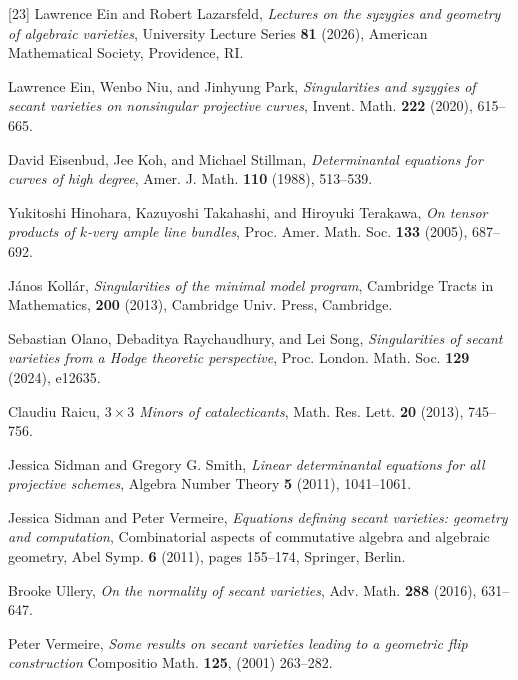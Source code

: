 \documentclass{amsart}
\theoremstyle{plain}
\theoremstyle{definition}
\theoremstyle{remark}
\begin{document}
\begin{thebibliography}{[23]}
Lawrence Ein and Robert Lazarsfeld, \emph{Lectures on the syzygies and geometry of algebraic varieties}, University Lecture Series \textbf{81} (2026), 
American Mathematical Society, Providence, RI.

Lawrence Ein, Wenbo Niu, and Jinhyung Park, \emph{Singularities and syzygies of secant varieties on nonsingular projective curves}, Invent. \!Math. \textbf{222} (2020), 615--665.

David Eisenbud, Jee Koh, and Michael Stillman, \textit{Determinantal equations for curves of high degree}, Amer. J. Math. \textbf{110} (1988), 513--539.

 Yukitoshi Hinohara, Kazuyoshi Takahashi, and Hiroyuki Terakawa, \textit{On tensor products of $k$-very ample line bundles}, Proc. Amer. Math. Soc. \textbf{133} (2005), 687--692.

 J\'{a}nos Koll\'{a}r, \emph{Singularities of the minimal model program}, Cambridge Tracts in Mathematics, \textbf{200} (2013), Cambridge Univ. \!Press, Cambridge.

Sebastian Olano, Debaditya Raychaudhury, and Lei Song, \textit{Singularities of secant varieties from a Hodge theoretic perspective}, Proc. London. Math. Soc. \textbf{129} (2024), e12635.

Claudiu Raicu,
\newblock \textit{$3\times 3$ Minors of catalecticants},
\newblock Math. Res. Lett. \textbf{20} (2013), 745--756.

Jessica Sidman and Gregory G. Smith, \textit{Linear determinantal equations for all projective schemes}, Algebra Number Theory \textbf{5} (2011), 1041--1061.

Jessica Sidman and Peter Vermeire, \textit{Equations defining secant varieties: geometry and computation}, Combinatorial aspects of commutative algebra and algebraic geometry, Abel Symp. \textbf{6} (2011), pages 155--174, Springer, Berlin.

Brooke Ullery, \emph{On the normality of secant varieties},
Adv. \!Math. \textbf{288} (2016), 631--647.

Peter Vermeire, \emph{Some results on secant varieties leading to a geometric flip construction} Compositio \!Math. \textbf{125}, (2001) 263--282.

\end{thebibliography}
\end{document}
